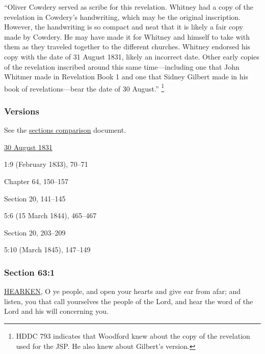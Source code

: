 			``Oliver Cowdery served as scribe for this revelation. Whitney had a copy of the revelation in Cowdery's handwriting, which may be the original inscription. However, the handwriting is so compact and neat that it is likely a fair copy made by Cowdery. He may have made it for Whitney and himself to take with them as they traveled together to the different churches. Whitney endorsed his copy with the date of 31 August 1831, likely an incorrect date. Other early copies of the revelation inscribed around this same time---including one that John Whitmer made in Revelation Book 1 and one that Sidney Gilbert made in his book of revelations---bear the date of 30 August.''%
				\footnote{%
					HDDC 793 indicates that Woodford knew about the copy of the revelation used for the JSP. He also knew about Gilbert's version.
					}
		
	\subsubsection{Versions}
		\label{DC63-V}
		
		See the \href{https://drive.google.com/file/d/1goAvNz8jS4R8slYfMG_db55Ty2z_vmgK/view?usp=sharing}{sections comparison} document.
	
		\begin{compactdesc}
			\item[JSP] \hyperref[EMS-1831-JS-30-AUG-1831]{30 August 1831}
			\item[EMS] 1:9 (February 1833), 70--71
			\item[BC] Chapter 64, 150--157
			\item[DC 1835] Section 20, 141--145
			\item[TS] 5:6 (15 March 1844), 465--467
			\item[DC 1844] Section 20, 203--209
			\item[MS] 5:10 (March 1845), 147--149
		\end{compactdesc}

	\subsubsection{Section 63:1} %
		\label{DC63-1}

		\hyperref[HEARKEN]{HEARKEN}, O ye people, and open your hearts and give ear from afar; and listen, you that call yourselves the people of the Lord, and hear the word of the Lord and his will concerning you.

